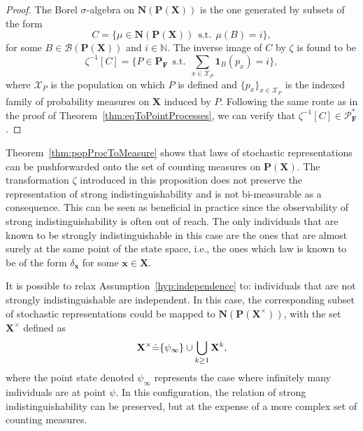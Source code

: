 \documentclass{aptpub}
\numberwithin{equation}{section}
\begin{document}
\begin{proof}
The Borel $\sigma$-algebra on ${\mathbf{N}}({\mathbf{P}}({\mathbf{X}}))$ is the one generated by subsets of the form
{\begin{equation*}{
C = \{ \mu \in {\mathbf{N}}({\mathbf{P}}({\mathbf{X}})) {\;\,\mbox{s.t.}\;\,} \mu(B) = i \},
}\end{equation*}}
for some $B \in {\mathcal{B}}({\mathbf{P}}({\mathbf{X}}))$ and $i \in {\mathbb{N}}$. The inverse image of $C$ by $\zeta$ is found to be
{\begin{equation*}{
\zeta^{-1}[C] = \bigg\{ P \in {\mathbf{P}}_{\mathbf{F}} {\;\,\mbox{s.t.}\;\,} \sum_{x \in {\mathcal{X}}_P} {{\mathbf{1}}_{{B}}}(p_x) = i \bigg\},
}\end{equation*}}
where ${\mathcal{X}}_P$ is the population on which $P$ is defined and $\{p_x\}_{x \in {\mathcal{X}}_P}$ is the indexed family of probability measures on ${\mathbf{X}}$ induced by $P$. Following the same route as in the proof of Theorem~\ref{thm:eqToPointProcesses}, we can verify that $\zeta^{-1}[C] \in {\mathcal{P}}^*_{\mathbf{F}}$.
\end{proof}

Theorem~\ref{thm:popProcToMeasure} shows that laws of stochastic representations can be pushforwarded onto the set of counting measures on ${\mathbf{P}}({\mathbf{X}})$. The transformation $\zeta$ introduced in this proposition does not preserve the representation of strong indistinguishability and is not bi-measurable as a consequence. This can be seen as beneficial in practice since the observability of strong indistinguishability is often out of reach. The only individuals that are known to be strongly indistinguishable in this case are the ones that are almost surely at the same point of the state space, i.e., the ones which law is known to be of the form $\delta_{\mathbf{x}}$ for some ${\mathbf{x}} \in {\mathbf{X}}$.

\begin{remark}
It is possible to relax Assumption~\ref{hyp:independence} to: individuals that are not strongly indistinguishable are independent. In this case, the corresponding subset of stochastic representations could be mapped to ${\mathbf{N}}({\mathbf{P}}({\mathbf{X}}^{\times}))$, with the set ${\mathbf{X}}^{\times}$ defined as
{\begin{equation}\label{{eq:defBoXTimes}}{
{\mathbf{X}}^{\times} {\doteq} \{\psi_{\infty}\} \cup \bigcup_{k \geq 1} {\mathbf{X}}^k,
}\end{equation}}
where the point state denoted $\psi_{\infty}$ represents the case where infinitely many individuals are at point $\psi$. In this configuration, the relation of strong indistinguishability can be preserved, but at the expense of a more complex set of counting measures.
\end{remark}
\end{document}
